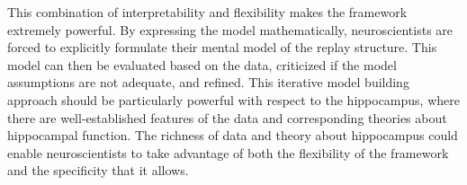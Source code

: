 \documentclass[conference]{IEEEtran}
\begin{document}
This combination of interpretability and flexibility makes the framework extremely powerful. By expressing the model mathematically, neuroscientists are forced to explicitly formulate their mental model of the replay structure. This model can then be evaluated based on the data, criticized if the model assumptions are not adequate, and refined. This iterative model building approach should be particularly powerful with respect to the hippocampus, where there are well-established features of the data and corresponding theories about hippocampal function. The richness of data and theory about hippocampus could enable neuroscientists to take advantage of both the flexibility of the framework and the specificity that it allows.

\printbibliography
\end{document}
